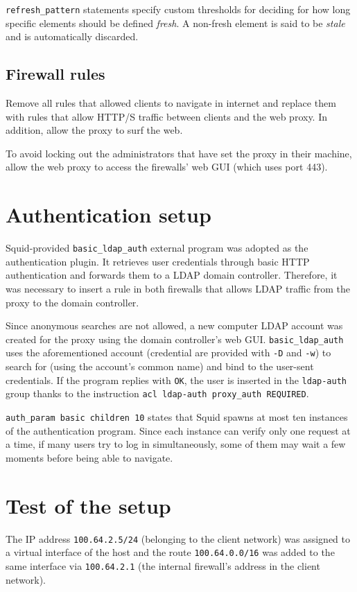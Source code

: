 \documentclass[draft]{homework}
\newcommand{\sq}{Squid\xspace}
\begin{document}
    \texttt{refresh\_pattern} statements specify custom thresholds for deciding for how long specific elements should be defined \textit{fresh}.
    A non-fresh element is said to be \textit{stale} and is automatically discarded.
    
    \subsection{Firewall rules}
    Remove all rules that allowed clients to navigate in internet and replace them with rules that allow HTTP/S traffic between clients and the web proxy.
    In addition, allow the proxy to surf the web.
    
    To avoid locking out the administrators that have set the proxy in their machine, allow the web proxy to access the firewalls' web GUI (which uses port 443).
    
    
    \section{Authentication setup}
    \sq-provided \texttt{basic\_ldap\_auth} external program was adopted as the authentication plugin.
    It retrieves user credentials through basic HTTP authentication and forwards them to a LDAP domain controller.
    Therefore, it was necessary to insert a rule in both firewalls that allows LDAP traffic from the proxy to the domain controller.
    
    Since anonymous searches are not allowed, a new computer LDAP account was created for the proxy using the domain controller's web GUI.
    \texttt{basic\_ldap\_auth} uses the aforementioned account (credential are provided with \texttt{-D} and \texttt{-w}) to search for (using the account's common name) and bind to the user-sent credentials.
    If the program replies with \texttt{OK}, the user is inserted in the \texttt{ldap-auth} group thanks to the instruction \texttt{acl ldap-auth proxy_auth REQUIRED}.
    
    \texttt{auth\_param basic children 10} states that \sq spawns at most ten instances of the authentication program.
    Since each instance can verify only one request at a time, if many users try to log in simultaneously, some of them may wait a few moments before being able to navigate.
    
    
    \section{Test of the setup}
    The IP address \texttt{100.64.2.5/24} (belonging to the client network) was assigned to a virtual interface of the host and the route \texttt{100.64.0.0/16} was added to the same interface via \texttt{100.64.2.1} (the internal firewall's address in the client network).
    
\end{document}
